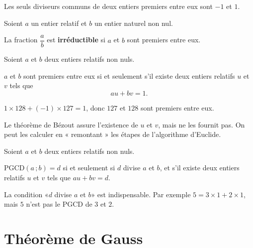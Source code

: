 \remarque
Les seuls diviseurs communs de deux entiers premiers entre eux sont $-1$ et $1$.

\begin{definition}
	Soient $a$ un entier relatif et $b$ un entier naturel non nul.

	La fraction $\dfrac{a}{b}$ est \textbf{irréductible} si $a$ et $b$ sont premiers entre eux.
\end{definition}

%

\begin{theoreme}
	Soient $a$ et $b$ deux entiers relatifs non nuls.

	$a$ et $b$ sont premiers entre eux si et seulement s'il existe deux entiers relatifs $u$ et $v$ tels que
	$$
	au + bv = 1.
	$$
\end{theoreme}

\begin{exemple}
	$1 \times 128 + (-1) \times 127 = 1$, donc $127$ et $128$ sont premiers entre eux.
\end{exemple}

\remarque
Le théorème de Bézout assure l'existence de $u$ et $v$, mais ne les fournit pas.
On peut les calculer en « remontant » les étapes de l'algorithme d'Euclide.

\begin{theoreme}
	Soient $a$ et $b$ deux entiers relatifs non nuls.

	$\mathrm{PGCD}(a\,;b) = d$ si et seulement si $d$ divise $a$ et $b$, et s'il existe deux entiers
	relatifs $u$ et $v$ tels que $au + bv = d$.
\end{theoreme}

\remarque
La condition «$d$ divise $a$ et $b$» est indispensable.
Par exemple $5 = 3 \times 1 + 2 \times 1$, mais $5$ n'est pas le PGCD de $3$ et $2$.


\section{Théorème de Gauss}

